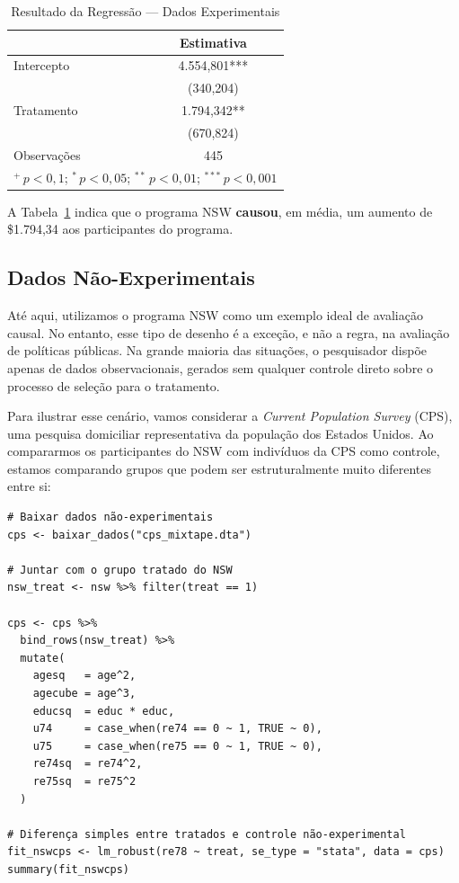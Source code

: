 \documentclass[12pt,a4paper]{article}
\begin{document}
\begin{table}[H]
\centering
\caption{Resultado da Regressão --- Dados Experimentais}\label{tab:reg1}
\begin{tabular}{lc}
\toprule
 & Estimativa \\
\midrule
Intercepto \hspace{60mm} & 4.554,801*** \\
 & (340,204) \\
Tratamento & 1.794,342** \\
 & (670,824) \\
Observações & 445 \\
\bottomrule
\multicolumn{2}{l}{\footnotesize $^{+}\,p<0{,}1$;\; $^{*}\,p<0{,}05$;\; $^{**}\,p<0{,}01$;\; $^{***}\,p<0{,}001$}\\
\end{tabular}
\end{table}

A Tabela~\ref{tab:reg1} indica que o programa NSW \textbf{causou}, em média, um aumento de \$1.794,34 aos participantes do programa.

\subsection{Dados Não-Experimentais}

Até aqui, utilizamos o programa NSW como um exemplo ideal de avaliação causal. No entanto, esse tipo de desenho é a exceção, e não a regra, na avaliação de políticas públicas. Na grande maioria das situações, o pesquisador dispõe apenas de dados observacionais, gerados sem qualquer controle direto sobre o processo de seleção para o tratamento.

Para ilustrar esse cenário, vamos considerar a \textit{Current Population Survey} (CPS), uma pesquisa domiciliar representativa da população dos Estados Unidos. Ao compararmos os participantes do NSW com indivíduos da CPS como controle, estamos comparando grupos que podem ser estruturalmente muito diferentes entre si:

\begin{lstlisting}[style=Rstyle]
# Baixar dados não-experimentais
cps <- baixar_dados("cps_mixtape.dta")

# Juntar com o grupo tratado do NSW
nsw_treat <- nsw %>% filter(treat == 1)

cps <- cps %>%
  bind_rows(nsw_treat) %>%
  mutate(
    agesq   = age^2,
    agecube = age^3,
    educsq  = educ * educ,
    u74     = case_when(re74 == 0 ~ 1, TRUE ~ 0),
    u75     = case_when(re75 == 0 ~ 1, TRUE ~ 0),
    re74sq  = re74^2,
    re75sq  = re75^2
  )

# Diferença simples entre tratados e controle não-experimental
fit_nswcps <- lm_robust(re78 ~ treat, se_type = "stata", data = cps)
summary(fit_nswcps)
\end{lstlisting}
\end{document}
